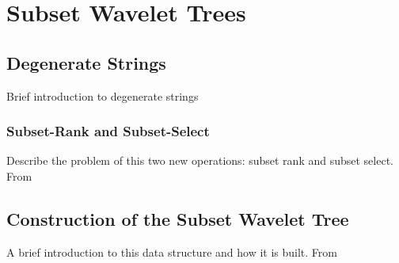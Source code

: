 
\chapter{Subset Wavelet Trees} %

\label{ch:Chapter4} %

\section{Degenerate Strings}
Brief introduction to degenerate strings
\subsection{Subset-Rank and Subset-Select}
Describe the problem of this two new operations: subset rank and subset select. From \cite{alanko_et_al:LIPIcs.SEA.2023.4}

\section{Construction of the Subset Wavelet Tree}
A brief introduction to this data structure and how it is built. From \cite{alanko_et_al:LIPIcs.SEA.2023.4}
